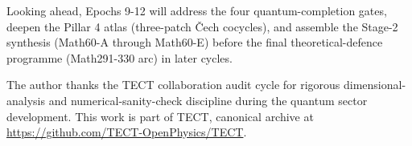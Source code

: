 Looking ahead, Epochs 9-12 will address the four quantum-completion gates,
deepen the Pillar 4 atlas (three-patch Čech cocycles), and assemble the
Stage-2 synthesis (Math60-A through Math60-E) before the final theoretical-defence
programme (Math291-330 arc) in later cycles.

\begin{acknowledgments}
The author thanks the TECT collaboration audit cycle for rigorous
dimensional-analysis and numerical-sanity-check discipline during the
quantum sector development. This work is part of TECT, canonical
archive at
\url{https://github.com/TECT-OpenPhysics/TECT}.
\end{acknowledgments}





